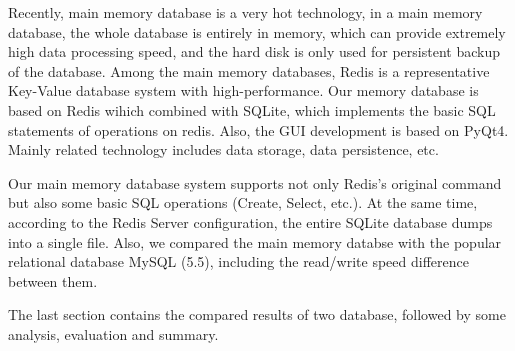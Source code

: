 \begin{abstracte}
Recently, main memory database is a very hot technology, 
in a main memory database, the whole database is entirely in memory, 
which can provide extremely high data processing speed, 
and the hard disk is only used for persistent backup of the database. 
Among the main memory databases, 
Redis is a representative Key-Value database system with high-performance. 
Our memory database is based on Redis wihich combined with SQLite, 
which implements the basic SQL statements of operations on redis. 
Also, the GUI development is based on PyQt4. 
Mainly related technology includes data storage, data persistence, etc.

Our main memory database system supports not only Redis's original command but also 
some basic SQL operations (Create, Select, etc.).
At the same time, according to the Redis Server configuration, the entire SQLite 
database dumps into a single file.
Also, we compared the main memory databse with the popular relational database MySQL (5.5), 
including the read/write speed difference between them.

The last section contains the compared results of two database, followed by some analysis, evaluation and summary.

\end{abstracte}
